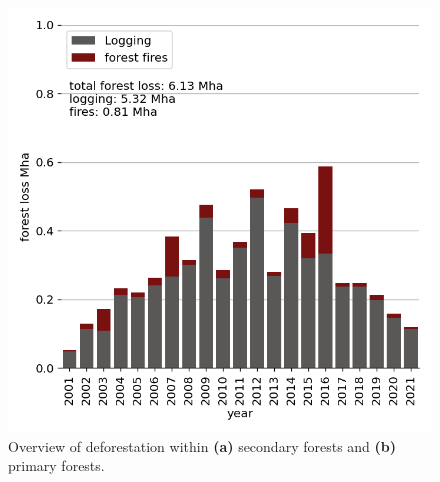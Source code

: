 \documentclass[
  letterpaper,
  DIV=11,
  numbers=noendperiod]{scrreprt}
\begin{document}
\begin{figure}
\begin{minipage}[t]{0.46\linewidth}
{{\includegraphics{text/../code/results/final_plots/total_primary_forest_deforestation.png}

}

}

\end{minipage}%

\caption{\label{fig-forestlossbarcharts}Overview of deforestation within
\textbf{(a)} secondary forests and \textbf{(b)} primary forests.}

\end{figure}
\end{document}
